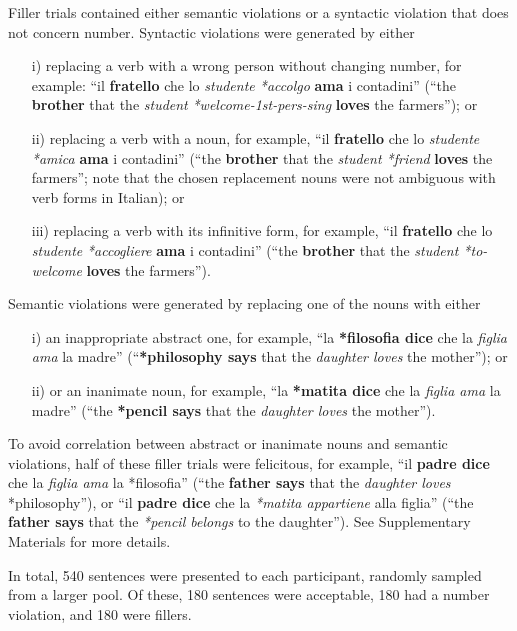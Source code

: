 Filler trials contained either semantic violations or a syntactic violation that does not concern number. 
Syntactic violations were generated by either \begin{itemize}\setlength\itemsep{0mm}
\item [i)] replacing a verb with a wrong person without changing number, for example: ``il \textbf{fratello} che lo \emph{studente *accolgo} \textbf{ama} i contadini'' (``the \textbf{brother} that the \emph{student} \emph{*welcome-1st-pers-sing} \textbf{loves} the farmers''); or
\item[ii)] replacing a verb with a noun, for example, ``il \textbf{fratello} che lo \emph{studente} \emph{*amica} \textbf{ama} i contadini'' (``the \textbf{brother} that the \emph{student *friend} \textbf{loves} the farmers''; note that the chosen replacement nouns were not ambiguous with verb forms in Italian); or 
\item[iii)] replacing a verb with its infinitive form, for example, ``il \textbf{fratello} che lo \emph{studente} \emph{*accogliere} \textbf{ama} i contadini'' (``the \textbf{brother} that the \emph{student *to-welcome} \textbf{loves} the farmers''). 
\end{itemize}
Semantic violations were generated by replacing one of the nouns with either\begin{itemize}\setlength\itemsep{0mm}
\item[i)] an inappropriate abstract one, for example, ``la \textbf{*filosofia dice} che la \emph{figlia ama} la madre'' (``\textbf{*philosophy says} that the \emph{daughter loves} the mother''); or
\item[ii)] or an inanimate noun, for example, ``la \textbf{*matita dice} che la \emph{figlia ama} la madre'' (``the \textbf{*pencil says} that the \emph{daughter loves} the mother''). 
\end{itemize}

To avoid correlation between abstract or inanimate nouns and semantic violations, half of these filler trials were felicitous, for example, ``il \textbf{padre dice} che la \emph{figlia ama} la *filosofia'' (``the \textbf{father says} that the \emph{daughter loves} *philosophy''), or ``il \textbf{padre dice} che la \emph{*matita appartiene} alla figlia'' (``the \textbf{father says} that the \emph{*pencil belongs} to the daughter''). 
See Supplementary Materials for more details.

In total, 540 sentences were presented to each participant, randomly sampled from a larger pool. Of these, 180 sentences were acceptable, 180 had a number violation, and 180 were fillers.

